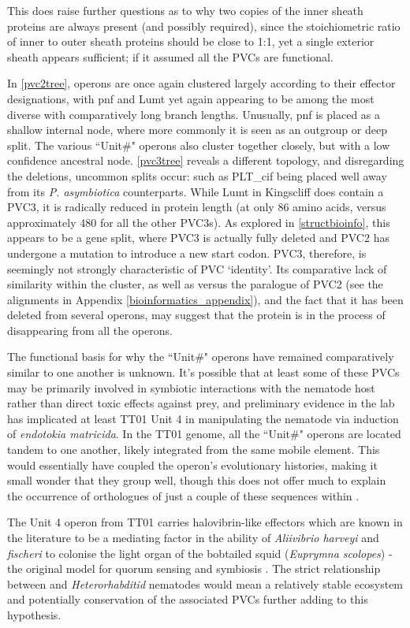 This does raise further questions as to why two copies of the inner sheath proteins are always present (and possibly required), since the stoichiometric ratio of inner to outer sheath proteins should be close to 1:1, yet a single exterior sheath appears sufficient; if it assumed all the PVCs are functional.

In \vref{pvc2tree}, operons are once again clustered largely according to their effector designations, with pnf and Lumt yet again appearing to be among the most diverse with comparatively long branch lengths. Unusually, pnf is placed as a shallow internal node, where more commonly it is seen as an outgroup or deep split. The various ``Unit\#" operons also cluster together closely, but with a low confidence ancestral node. \vref{pvc3tree} reveals a different topology, and disregarding the deletions, uncommon splits occur: such as PLT\_cif being placed well away from its \emph{P. asymbiotica} counterparts. While Lumt in Kingscliff does contain a PVC3, it is radically reduced in protein length (at only 86 amino acids, versus approximately 480 for all the other PVC3s). As explored in \vref{structbioinfo}, this appears to be a gene split, where PVC3 is actually fully deleted and PVC2 has undergone a mutation to introduce a new start codon. PVC3, therefore, is seemingly not strongly characteristic of PVC `identity'. Its comparative lack of similarity within the cluster, as well as versus the paralogue of PVC2 (see the alignments in Appendix \vref{bioinformatics_appendix}), and the fact that it has been deleted from several operons, may suggest that the protein is in the process of disappearing from all the operons.

The functional basis for why the ``Unit\#" operons have remained comparatively similar to one another is unknown. It's possible that at least some of these PVCs may be primarily involved in symbiotic interactions with the nematode host rather than direct toxic effects against prey, and preliminary evidence in the lab has implicated at least \Plum{} TT01 Unit 4 in manipulating the nematode via induction of \emph{endotokia matricida}. In the \Plum{} TT01 genome, all the ``Unit\#" operons are located tandem to one another, likely integrated from the same mobile element. This would essentially have coupled the operon's evolutionary histories, making it small wonder that they group well, though this does not offer much to explain the occurrence of orthologues of just a couple of these sequences within \Pasy.

The Unit 4 operon from TT01 carries halovibrin-like effectors which are known in the literature to be a mediating factor in the ability of \emph{Aliivibrio harveyi} and \emph{fischeri} to colonise the light organ of the bobtailed squid (\emph{Euprymna scolopes}) - the original model for quorum sensing and symbiosis \citep{Ruby1999, Verma2013}. The strict relationship between \Pa{} and \emph{Heterorhabditid} nematodes would mean a relatively stable ecosystem and potentially conservation of the associated PVCs further adding to this hypothesis.

